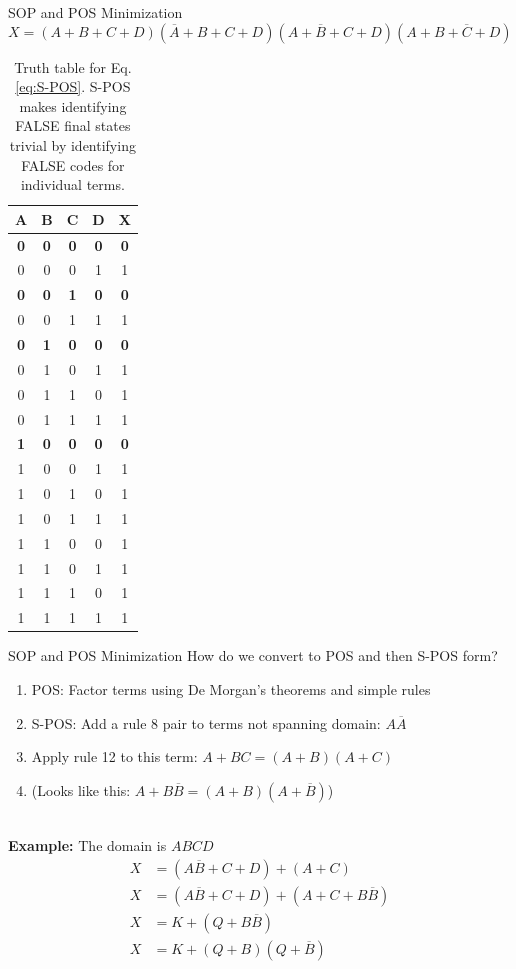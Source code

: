 \documentclass{beamer}
\begin{document}
\begin{frame}{SOP and POS Minimization}
\begin{equation}
X = (A+B+C+D)(\overline{A}+B+C+D)(A+\overline{B}+C+D)(A+B+\overline{C}+D) \label{eq:S-POS}
\end{equation}
\tiny
\begin{table}
\begin{tabular}{c c c c c}
\textbf{A} & \textbf{B} & \textbf{C} & \textbf{D} & \textbf{X} \\ \hline
\textbf{0} & \textbf{0} & \textbf{0} & \textbf{0} & \textbf{0} \\ \hline
0 & 0 & 0 & 1 & 1 \\ \hline
\textbf{0} & \textbf{0} & \textbf{1} & \textbf{0} & \textbf{0} \\ \hline
0 & 0 & 1 & 1 & 1 \\ \hline
\textbf{0} & \textbf{1} & \textbf{0} & \textbf{0} & \textbf{0} \\ \hline
0 & 1 & 0 & 1 & 1 \\
0 & 1 & 1 & 0 & 1 \\
0 & 1 & 1 & 1 & 1 \\ \hline
\textbf{1} & \textbf{0} & \textbf{0} & \textbf{0} & \textbf{0} \\ \hline
1 & 0 & 0 & 1 & 1 \\
1 & 0 & 1 & 0 & 1 \\
1 & 0 & 1 & 1 & 1 \\
1 & 1 & 0 & 0 & 1 \\
1 & 1 & 0 & 1 & 1 \\
1 & 1 & 1 & 0 & 1 \\
1 & 1 & 1 & 1 & 1 \\
\end{tabular}
\caption{\label{tab:TT2} Truth table for Eq. \ref{eq:S-POS}. S-POS makes identifying FALSE final states trivial by identifying FALSE codes for individual terms.}
\end{table}
\end{frame}

\begin{frame}{SOP and POS Minimization}
\small
How do we convert to POS and then S-POS form?
\begin{enumerate}
\item POS: Factor terms using De Morgan's theorems and simple rules
\item S-POS: Add a rule 8 pair to terms not spanning domain: $A\overline{A}$
\item Apply rule 12 to this term: $A+BC = (A+B)(A+C)$
\item (Looks like this: $A+B\overline{B} = (A+B)(A+\overline{B})$)
\end{enumerate} \hrulefill \\
\textbf{Example:} The domain is $ABCD$
\begin{align}
X &= (A\overline{B}+C+D)+(A+C) \\
X &= (A\overline{B}+C+D) + (A+C+B\overline{B}) \\
X &= K+(Q+B\overline{B}) \\
X &= K+(Q+B)(Q+\overline{B}) \\
\end{align}
\end{frame}
\end{document}
